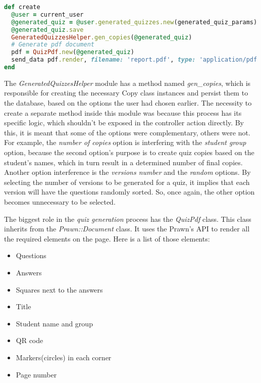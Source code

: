 \begin{lstlisting}[language=Ruby, caption={Create method of the GeneratedQuizzesController class}, label=create_method]
def create
  @user = current_user
  @generated_quiz = @user.generated_quizzes.new(generated_quiz_params)
  @generated_quiz.save
  GeneratedQuizzesHelper.gen_copies(@generated_quiz)
  # Generate pdf document
  pdf = QuizPdf.new(@generated_quiz)
  send_data pdf.render, filename: 'report.pdf', type: 'application/pdf', disposition: 'inline'
end
\end{lstlisting}

The \textit{GeneratedQuizzesHelper} module has a method named \textit{gen\_copies}, which is responsible for creating the necessary Copy class instances and persist them to the database, based on the options the user had chosen earlier. The necessity to create a separate method inside this module was because this process has its specific logic, which shouldn't be exposed in the controller action directly. By this, it is meant that some of the options were complementary, others were not. For example, the \textit{number of copies} option is interfering with the \textit{student group} option, because the second option's purpose is to create quiz copies based on the student's names, which in turn result in a determined number of final copies. Another option interference is the \textit{versions number} and the \textit{random} options. By selecting the number of versions to be generated for a quiz, it implies that each version will have the questions randomly sorted. So, once again, the other option becomes unnecessary to be selected.

The biggest role in the \textit{quiz generation} process has the \textit{QuizPdf} class. This class inherits from the \textit{Prawn::Document} class. It uses the Prawn's API to render all the required elements on the page. Here is a list of those elements: 
\begin{itemize}
  \item Questions
  \item Answers
  \item Squares next to the answers
  \item Title
  \item Student name and group
  \item QR code
  \item Markers(circles) in each corner
  \item Page number
\end{itemize}

